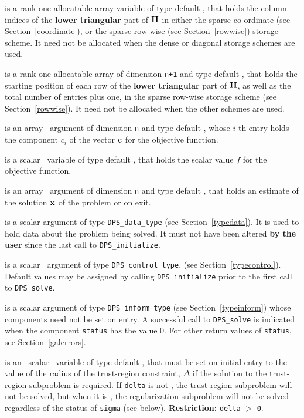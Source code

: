 \documentclass{galahad}
\newcommand{\packagename}{DPS}
\begin{document}
\begin{description}
\begin{description}
 is a rank-one allocatable array variable of type default \integer,
that holds the column indices of the {\bf lower triangular} part of
${\mathbf{H}}$ in either the sparse co-ordinate
(see Section~\ref{coordinate}), or the sparse row-wise
(see Section~\ref{rowwise}) storage scheme.
It need not be allocated when the dense or diagonal storage schemes are used.

 is a rank-one allocatable array of dimension {\tt n+1} and type
default \integer, that holds the starting position of
each row of the {\bf lower triangular} part of ${\mathbf{H}}$, as well
as the total number of entries plus one, in the sparse row-wise storage
scheme (see Section~\ref{rowwise}). It need not be allocated when the
other schemes are used.
\end{description}

 is an array \intentin\ argument of dimension {\tt n} and
type default \realdp,  whose $i$-th entry holds the component $c_i$ of
the vector ${\mathbf{c}}$ for the objective function.

 is a scalar \intentin\ variable of type default \realdp, that holds
the scalar value $f$ for the objective function.

 is an array \intentout\ argument of dimension {\tt n} and
type default \realdp, that holds an estimate of the solution ${\mathbf{x}}$
of the problem  or  on exit.

 is a scalar \intentinout argument of type
{\tt \packagename\_data\_type}
(see Section~\ref{typedata}). It is used to hold data about the problem being
solved. It must not have been altered {\bf by the user} since the last call to
{\tt \packagename\_initialize}.

 is a scalar \intentin\ argument of type
{\tt \packagename\_control\_type}.
(see Section~\ref{typecontrol}).
Default values may be assigned by calling {\tt \packagename\_initialize}
prior to the first call to {\tt \packagename\_solve}.

 is a scalar \intentinout argument of type
{\tt \packagename\_inform\_type}
(see Section~\ref{typeinform}) whose components need not be set on entry.
A successful call to
{\tt \packagename\_solve}
is indicated when the  component {\tt status} has the value 0.
For other return values of {\tt status}, see Section~\ref{galerrors}.

 is an \optional\ scalar \intentin\ variable of type default
\realdp, that must be set on initial entry
to the value of the radius of the trust-region constraint, $\Delta$
if the solution to the trust-region subproblem  is required.
If {\tt delta} is not \present, the trust-region subproblem will not be
solved, but when it is \present, the regularization subproblem will not be
solved regardless of the status of {\tt sigma} (see below).
{\bf Restriction: } {\tt delta} $>$ {\tt 0}.


\end{description}
\end{document}
